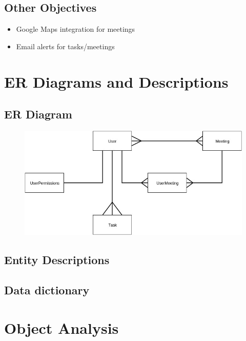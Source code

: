 \subsection{Other Objectives}
	\begin{itemize}
		\item Google Maps integration for meetings
		\item Email alerts for tasks/meetings
	\end{itemize}

\section{ER Diagrams and Descriptions}

\subsection{ER Diagram}

\begin{figure}[H]
	\includegraphics[width=\textwidth]{./Analysis/diagrams/era.jpg}
\end{figure}

\subsection{Entity Descriptions}


\subsection{Data dictionary}


\section{Object Analysis}

